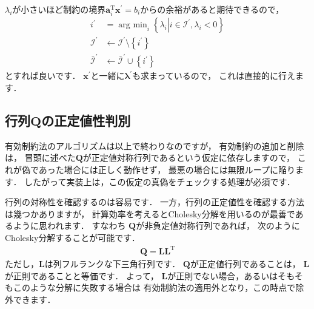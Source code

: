 ﻿\documentclass{jsarticle}
\begin{document}
$\lambda_{i}$が小さいほど制約の境界$\boldsymbol{a}_{i}^{\mathrm{T}}\boldsymbol{x}^{\prime}=b_{i}$からの余裕があると期待できるので，
\begin{align*}
i^{\prime}&=\mathop{\mathrm{arg~min}}_{i}\left\{\lambda_{i}\left|i\in\mathcal{I}^{\prime}, \lambda_{i}<0\right.\right\}
\\
\mathcal{I}^{\prime}&\leftarrow\mathcal{I}^{\prime}\setminus\left\{i^{\prime}\right\}
\\
\bar{\mathcal{I}}^{\prime}&\leftarrow\bar{\mathcal{I}}^{\prime}\cup\left\{i^{\prime}\right\}
\end{align*}
とすれば良いです．
$\boldsymbol{x}^{\prime}$と一緒に$\boldsymbol{\lambda}^{\prime}$も求まっているので，
これは直接的に行えます．

\subsection{行列$\boldsymbol{Q}$の正定値性判別}

有効制約法のアルゴリズムは以上で終わりなのですが，
有効制約の追加と削除は，
冒頭に述べた$\boldsymbol{Q}$が正定値対称行列であるという仮定に依存しますので，
これが偽であった場合には正しく動作せず，
最悪の場合には無限ループに陥ります．
したがって実装上は，この仮定の真偽をチェックする処理が必須です．

行列の対称性を確認するのは容易です．
一方，行列の正定値性を確認する方法は幾つかありますが，
計算効率を考えるとCholesky分解を用いるのが最善であるように思われます．
すなわち
$\boldsymbol{Q}$が非負定値対称行列であれば，
次のようにCholesky分解することが可能です．
\begin{align*}
\boldsymbol{Q}=\boldsymbol{L}\boldsymbol{L}^{\mathrm{T}}
\end{align*}
ただし，$\boldsymbol{L}$は列フルランクな下三角行列です．
$\boldsymbol{Q}$が正定値行列であることは，
$\boldsymbol{L}$が正則であることと等価です．
よって，
$\boldsymbol{L}$が正則でない場合，あるいはそもそもこのような分解に失敗する場合は
有効制約法の適用外となり，この時点で除外できます．
\end{document}
